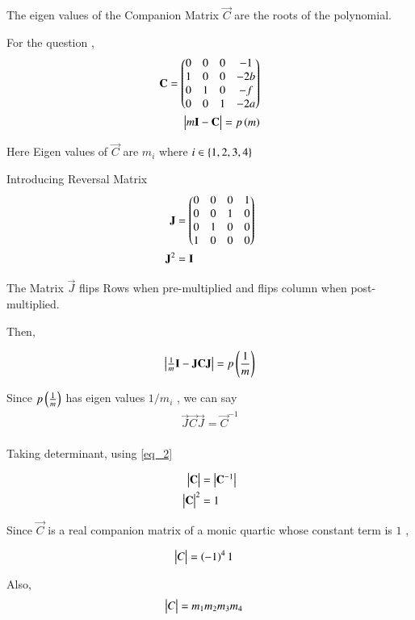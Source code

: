 \documentclass[journal]{IEEEtran}
\numberwithin{equation}{enumi}
\numberwithin{figure}{enumi}
\begin{document}
The eigen values of the Companion Matrix $\vec{C}$ are the roots of the polynomial.

For the question , 
\begin{align}
    \mathbf{C} = \begin{pmatrix}0&0&0&-1\\
                     1&0&0&-2b\\
                     0&1&0&-f\\
                     0&0&1&-2a\end{pmatrix}\\ 
    \begin{vmatrix}m\mathbf{I}- \mathbf{C}\end{vmatrix} = p\left(m\right)
\end{align}

Here Eigen values of $\vec{C}$ are $m_i$ where $i \in \left\{1,2,3,4\right\}$

Introducing Reversal Matrix 
\begin{align}
    \mathbf{J} &= \begin{pmatrix}0&0&0&1\\0&0&1&0\\0&1&0&0\\1&0&0&0\end{pmatrix} \\ 
    \mathbf{J}^2 &= \mathbf{I} \label{eq_2}
\end{align}

The Matrix $\vec{J}$ flips Rows when pre-multiplied and flips column when post-multiplied.

Then,

\begin{align}
    \begin{vmatrix}\frac{1}{m}\mathbf{I}-\mathbf{J}\mathbf{C}\mathbf{J}\end{vmatrix} = p\left(\frac{1}{m}\right)
\end{align}

Since $p\left(\frac{1}{m}\right)$ has eigen values $1/m_i$ , we can say 
\begin{align}
    \vec{J}\vec{C}\vec{J} = \vec{C}^{-1} \\
\end{align}

Taking determinant, using \ref{eq_2}

\begin{align}
    \begin{vmatrix}\mathbf{C}\end{vmatrix} &= \begin{vmatrix}\mathbf{C}^{-1}\end{vmatrix}\\
    \begin{vmatrix}\mathbf{C}\end{vmatrix}^2 &= 1 
\end{align}

Since $\vec{C}$ is a real companion matrix of a monic quartic whose constant term is $1$ , 

\begin{align}
    \begin{vmatrix}C\end{vmatrix} &= \left(-1\right)^4 1 
\end{align}

Also, 
\begin{align}
    \begin{vmatrix}C\end{vmatrix} &= m_1m_2m_3m_4
\end{align}
\end{document}
